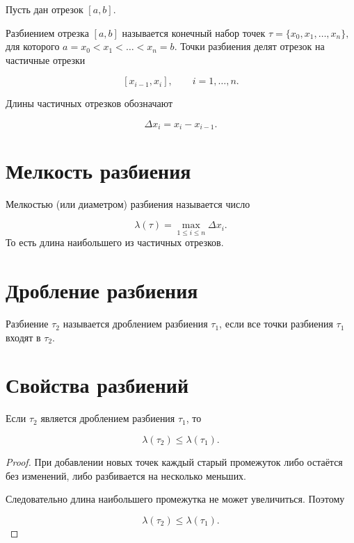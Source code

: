 \documentclass[14pt]{extreport}
\begin{document}
Пусть дан отрезок $[a,b].$

\begin{definition}
Разбиением отрезка $[a,b]$ называется конечный набор точек $\tau=\{x_0,x_1,\ldots,x_n\},$
для которого $a=x_0<x_1<\ldots<x_n=b.$
Точки разбиения делят отрезок на частичные отрезки

\[
[x_{i-1},x_i],
\qquad
i=1,\ldots,n.
\]
\end{definition}
Длины частичных отрезков обозначают

\[
\Delta x_i=x_i-x_{i-1}.
\]

\section{Мелкость разбиения}

\begin{definition}
Мелкостью (или диаметром) разбиения называется число

\[
\lambda(\tau)
=
\max_{1\le i\le n}\Delta x_i.
\]
То есть длина наибольшего из частичных отрезков.
\end{definition}

\section{Дробление разбиения}

\begin{definition}
Разбиение $\tau_2$ называется дроблением разбиения $\tau_1$,
если все точки разбиения $\tau_1$ входят в $\tau_2$.
\end{definition}

\section{Свойства разбиений}

\begin{theorem}
Если $\tau_2$ является дроблением разбиения $\tau_1$, то

\[
\lambda(\tau_2)\le\lambda(\tau_1).
\]
\end{theorem}

\begin{proof}

При добавлении новых точек каждый старый промежуток
либо остаётся без изменений, либо разбивается на несколько меньших.

Следовательно длина наибольшего промежутка не может увеличиться.
Поэтому

\[
\lambda(\tau_2)\le\lambda(\tau_1).
\]
\end{proof}
\end{document}
